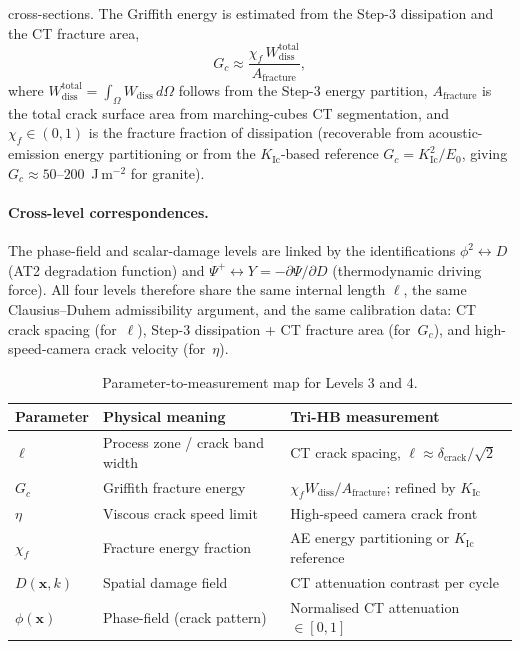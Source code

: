 \documentclass[11pt,a4paper,openany]{book}
\theoremstyle{handbook}
\begin{document}
cross-sections.  The Griffith energy is estimated from the Step-3 dissipation and
the CT fracture area,
%
\begin{equation}
G_c\approx\frac{\chi_f\,W_{\mathrm{diss}}^{\mathrm{total}}}{A_{\mathrm{fracture}}},
\label{eq:v6-gc}
\end{equation}
%
where $W_{\mathrm{diss}}^{\mathrm{total}}=\int_\Omega W_{\mathrm{diss}}\,d\Omega$
follows from the Step-3 energy partition, $A_{\mathrm{fracture}}$ is the total crack
surface area from marching-cubes CT segmentation, and $\chi_f\in(0,1)$ is the
fracture fraction of dissipation (recoverable from acoustic-emission energy
partitioning or from the $K_{\mathrm{Ic}}$-based reference
$G_c=K_{\mathrm{Ic}}^2/E_0$, giving $G_c\approx50$--$200$~J\,m$^{-2}$ for
granite).

\paragraph{Cross-level correspondences.}
The phase-field and scalar-damage levels are linked by the identifications
$\phi^2\leftrightarrow D$ (AT2 degradation function) and
$\Psi^+\leftrightarrow Y=-\partial\Psi/\partial D$ (thermodynamic driving
force).  All four levels therefore share the same internal length $\ell$, the same
Clausius--Duhem admissibility argument, and the same calibration data: CT crack
spacing (for~$\ell$), Step-3 dissipation + CT fracture area (for~$G_c$), and
high-speed-camera crack velocity (for~$\eta$).

\begin{table}[h]
\centering
\caption{Parameter-to-measurement map for Levels 3 and 4.}
\label{tab:spatial-calib}
\begin{tabular}{lll}
\toprule
Parameter & Physical meaning & Tri-HB measurement \\
\midrule
$\ell$ & Process zone / crack band width & CT crack spacing, $\ell\approx\delta_{\mathrm{crack}}/\sqrt{2}$ \\
$G_c$ & Griffith fracture energy & $\chi_f W_{\mathrm{diss}}/A_{\mathrm{fracture}}$; refined by $K_{\mathrm{Ic}}$ \\
$\eta$ & Viscous crack speed limit & High-speed camera crack front \\
$\chi_f$ & Fracture energy fraction & AE energy partitioning or $K_{\mathrm{Ic}}$ reference \\
$D(\mathbf{x},k)$ & Spatial damage field & CT attenuation contrast per cycle \\
$\phi(\mathbf{x})$ & Phase-field (crack pattern) & Normalised CT attenuation $\in[0,1]$ \\
\bottomrule
\end{tabular}
\end{table}
\end{document}

